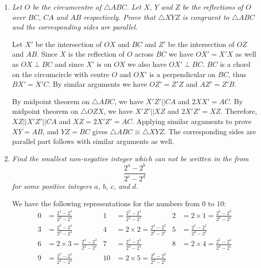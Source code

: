\documentclass{article}
\begin{document}
\begin{enumerate}[1.]
\item %
{\itshape Let $O$ be the circumcentre of $\triangle ABC$. Let $X$, $Y$ and $Z$ be the reflections of $O$ over $BC$, $CA$ and $AB$ respectively. Prove that $\triangle XYZ$ is congruent to $\triangle ABC$ and the corresponding sides are parallel.}

Let $X'$ be the intersection of $OX$ and $BC$ and $Z'$ be the intersection of $OZ$ and $AB$. Since $X$ is the reflection of $O$ across $BC$ we have $OX' = X'X$ as well as $OX \perp BC$ and since $X'$ is on $OX$ we also have $OX' \perp BC$. $BC$ is a chord on the circumcircle with centre $O$ and $OX'$ is a perpendicular on $BC$, thus $BX' = X'C$. By similar arguments we have $OZ' = Z'Z$ and $AZ' = Z'B$. 

By midpoint theorem on $\triangle ABC$, we have $X'Z'||CA$ and $2XX' = AC$. By midpoint theorem on $\triangle OZX$, we have $X'Z'||XZ$ and $2X'Z' = XZ$. Therefore, $XZ||X'Z'||CA$ and $XZ = 2X'Z' = AC$. Applying similar arguments to prove $XY = AB$, and $YZ = BC$ gives $\triangle ABC \equiv \triangle XYZ$. The corresponding sides are parallel part follows with similar arguments as well. 


\item %
{\itshape Find the smallest non-negative integer which can not be written in the from
\[
  \frac{2^a - 2^b}{2^c - 2^d}
\]
for some positive integers $a$, $b$, $c$, and $d$.}

We have the following representations for the numbers from $0$ to $10$:
\begin{align*}
  0 & = \frac{2^1 - 2^1}{2^2 - 2^1} & 1 & = \frac{2^2 - 2^1}{2^2 - 2^1} & 2 & = 2 \times 1 = \frac{2^3 - 2^2}{2^2 - 2^1} \\
  3 & = \frac{2^3 - 2^1}{2^2 - 2^1} & 4 & = 2 \times 2 = \frac{2^4 - 2^3}{2^2 - 2^1} & 5 & = \frac{2^5 - 2^1}{2^3 - 2^1} \\
  6 & = 2 \times 3 = \frac{2^4 - 2^2}{2^2 - 2^1} & 7 & = \frac{2^4 - 2^1}{2^2 - 2^1} & 8 & = 2 \times 4 = \frac{2^5 - 2^4}{2^2 - 2^1} \\
  9 & = \frac{2^7 - 2^1}{2^4 - 2^1} & 10 & = 2 \times 5 = \frac{2^6 - 2^2}{2^3 - 2^1} & &
\end{align*}


\end{enumerate}
\end{document}
